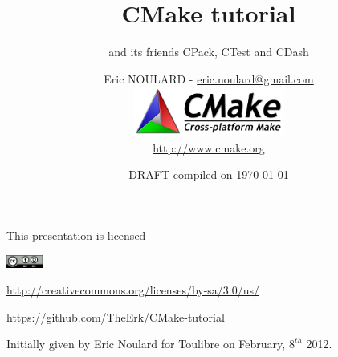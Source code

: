 \documentclass[compress,slidestop,table
              ]
               {beamer}
\begin{document}


\title{CMake tutorial}
\subtitle{and its friends CPack, CTest and CDash}
\author[Eric NOULARD - \url{eric.noulard@gmail.com}]{Eric NOULARD - \url{eric.noulard@gmail.com}\\
        \includegraphics[width=5cm]{figures/CMake-logo-small}\\
        \url{http://www.cmake.org}}
\date{DRAFT compiled on \today}
\subject{Slides for CMake, CPack, CTest, CDash presentation. In english.}

\begin{frame}
\titlepage
\begin{center}
{\tiny
This presentation is licensed

\includegraphics[width=1.2cm]{figures/by-sa}

\url{http://creativecommons.org/licenses/by-sa/3.0/us/}

\url{https://github.com/TheErk/CMake-tutorial}

Initially given by Eric Noulard for Toulibre on February, $8^{th}$ 2012.
}
\end{center}
\end{frame}
\end{document}
